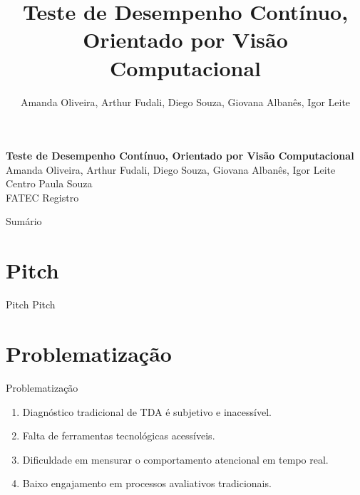 \documentclass{beamer}
\title[Teste de Desempenho Contínuo, Orientado por Visão Computacional]{\textbf{Teste de Desempenho Contínuo, Orientado por Visão Computacional}}
\author{Amanda Oliveira, Arthur Fudali, Diego Souza, Giovana Albanês, Igor Leite}
\date{}
\begin{document}
\begin{frame}
    \centering
    \vspace{1cm}
    {\color{cpsred}\Huge\textbf{Teste de Desempenho Contínuo, Orientado por Visão Computacional}}\\[0.8cm]
    {\Large Amanda Oliveira, Arthur Fudali, Diego Souza, Giovana Albanês, Igor Leite}\\[0.4cm]
    \textcolor{cpsgray}{Centro Paula Souza}\\[0.2cm]
    \textcolor{cpsgray}{FATEC Registro}
\end{frame}

\begin{frame}{Sumário}
\tableofcontents
\end{frame}


\section{Pitch}
\begin{frame}{Pitch}
\justifying
Pitch
\end{frame}

\section{Problematização}
\begin{frame}{Problematização}
\justifying
\begin{enumerate}
  \item Diagnóstico tradicional de TDA é subjetivo e inacessível.
  \item Falta de ferramentas tecnológicas acessíveis.
  \item Dificuldade em mensurar o comportamento atencional em tempo real.
  \item Baixo engajamento em processos avaliativos tradicionais.
\end{enumerate}
\end{frame}
\end{document}
